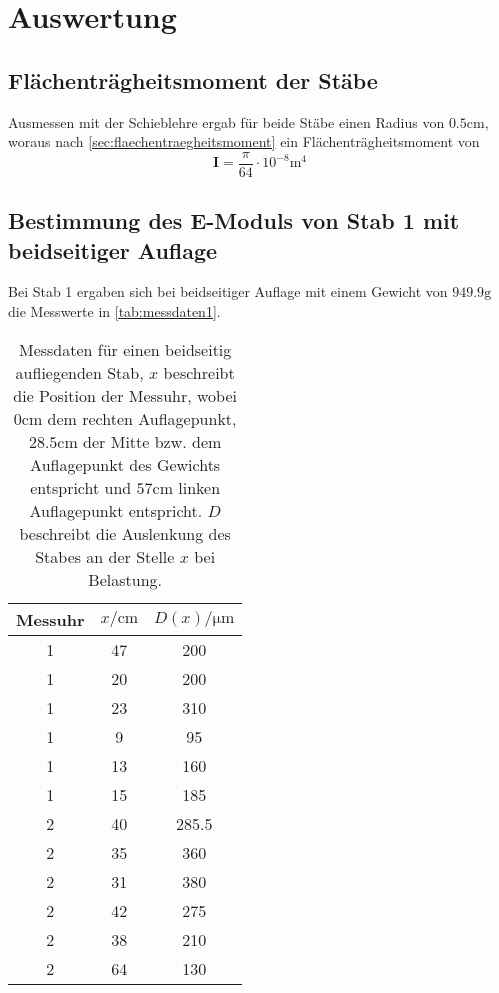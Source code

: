 \section{Auswertung}
\label{sec:Auswertung}
\subsection{Flächenträgheitsmoment der Stäbe}
Ausmessen mit der Schieblehre ergab für beide Stäbe einen Radius von 
$0.5\si{\centi\meter}$, woraus nach \autoref{sec:flaechentraegheitsmoment} ein
Flächenträgheitsmoment von
\begin{equation}
	\mathbf{I} 
	= \frac{\pi}{64} \cdot 10^{-8} \si{\m^4}
	\label{eqn:IWert}
\end{equation}

\subsection{Bestimmung des E-Moduls von Stab 1 mit beidseitiger Auflage}
\label{sec:messung1}
Bei Stab 1 ergaben sich bei beidseitiger Auflage mit einem Gewicht von $949.9 \si{\gram}$ 
die Messwerte in \autoref{tab:messdaten1}.

\begin{table}
	\centering
	\caption{Messdaten für einen beidseitig aufliegenden Stab, $x$ beschreibt
	die Position der Messuhr, wobei $0\si{\centi\meter}$
	dem rechten Auflagepunkt, $28.5\si{\centi\meter}$ der Mitte bzw. dem Auflagepunkt 
	des Gewichts entspricht und $57\si{\centi\meter}$ linken Auflagepunkt entspricht.
	$D$ beschreibt die Auslenkung des Stabes an der Stelle $x$ bei Belastung.}
	\label{tab:messdaten1}
	\begin{tabular}{c c c}
	\toprule
	Messuhr &
	$x / \si{\centi\meter}$ &
	$D(x) / \si{\micro\meter}$
	\\
	\midrule
	1 & 47 & 200 \\
	1 & 20 & 200 \\
	1 & 23 & 310 \\
	1 & 9 & 95 \\
	1 & 13 & 160 \\
	1 & 15 & 185 \\
	2 & 40 & 285.5 \\
	2 & 35 & 360 \\
	2 & 31 & 380 \\
	2 & 42 & 275 \\
	2 & 38 & 210 \\
	2 & 64 & 130 \\
	\bottomrule
\end{tabular}
\end{table}

